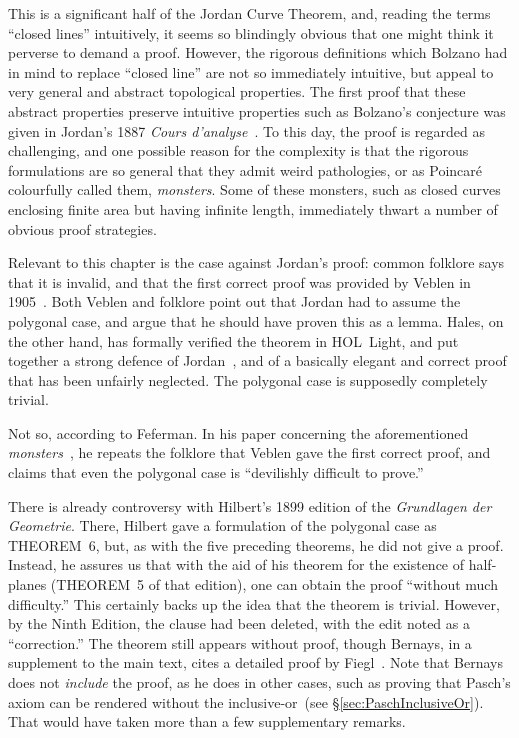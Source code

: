 This is a significant half of the Jordan Curve Theorem, and, reading the terms ``closed lines'' intuitively, it seems so blindingly obvious that one might think it perverse to demand a proof. However, the rigorous definitions which Bolzano had in mind to replace ``closed line'' are not so immediately intuitive, but appeal to very general and abstract topological properties. The first proof that these abstract properties preserve intuitive properties such as Bolzano's conjecture was given in Jordan's 1887 \emph{Cours d'analyse}~\cite{JordanTextBook}. To this day, the proof is regarded as challenging, and one possible reason for the complexity is that the rigorous formulations are so general that they admit weird pathologies, or as Poincar\'{e} colourfully called them, \emph{monsters}. Some of these monsters, such as closed curves enclosing finite area but having infinite length, immediately thwart a number of obvious proof strategies.

Relevant to this chapter is the case against Jordan's proof: common folklore says that it is invalid, and that the first correct proof was provided by Veblen in 1905~\cite{VeblenJordan}. Both Veblen and folklore point out that Jordan had to assume the polygonal case, and argue that he should have proven this as a lemma. Hales, on the other hand, has formally verified the theorem in HOL~Light, and put together a strong defence of Jordan~\cite{HalesJordansProof}, and of a basically elegant and correct proof that has been unfairly neglected. The polygonal case is supposedly completely trivial. 

Not so, according to Feferman. In his paper concerning the aforementioned \emph{monsters}~\cite{FefermanDevilishJCT}, he repeats the folklore that Veblen gave the first correct proof, and claims that even the polygonal case is ``devilishly difficult to prove.''

There is already controversy with Hilbert's 1899 edition of the \emph{Grundlagen der Geometrie}. There, Hilbert gave a formulation of the polygonal case as THEOREM~6, but, as with the five preceding theorems, he did not give a proof. Instead, he assures us that with the aid of his theorem for the existence of half-planes (THEOREM~5 of that edition), one can obtain the proof ``without much difficulty.'' This certainly backs up the idea that the theorem is trivial. However, by the Ninth Edition, the clause had been deleted, with the edit noted as a ``correction.'' The theorem still appears without proof, though Bernays, in a supplement to the main text, cites a detailed proof by Fiegl~\cite{FeiglJordan}. Note that Bernays does not \emph{include} the proof, as he does in other cases, such as proving that Pasch's axiom can be rendered without the inclusive-or~(see \S\ref{sec:PaschInclusiveOr}). That would have taken more than a few supplementary remarks.

